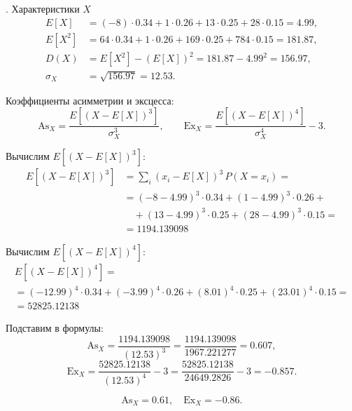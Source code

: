 \documentclass[a4paper,14pt]{extarticle}
\begin{document}
            
            . Характеристики $X$
            \[
                \begin{aligned}
                    E[X] &= (-8)\cdot0.34 + 1\cdot0.26 + 13\cdot0.25 + 28\cdot0.15 = 4.99, \\
                    E[X^2] &= 64\cdot0.34 + 1\cdot0.26 + 169\cdot0.25 + 784\cdot0.15 = 181.87, \\
                    D(X) &= E[X^2] - (E[X])^2 = 181.87 - 4.99^2 = 156.97, \\
                    \sigma_X &= \sqrt{156.97} = 12.53.
                \end{aligned}
            \]
            
            Коэффициенты асимметрии и эксцесса:
            \[
                \mathrm{As}_X = \frac{E[(X - E[X])^3]}{\sigma_X^3},
                \qquad
                \mathrm{Ex}_X = \frac{E[(X - E[X])^4]}{\sigma_X^4} - 3.
            \]
            
            Вычислим $E[(X - E[X])^3]$:
            \[
                \begin{aligned}
                    E[(X - E[X])^3] &= \sum_i (x_i - E[X])^3 \, P(X=x_i) = \\
                    &= (-8 - 4.99)^3 \cdot 0.34 + (1 - 4.99)^3 \cdot 0.26 + \\
                    &\quad + (13 - 4.99)^3 \cdot 0.25 + (28 - 4.99)^3 \cdot 0.15 = \\
                    &= 1194.139098
                \end{aligned}
            \]
            
            Вычислим $E[(X - E[X])^4]$:
            \begin{gather*}
                E[(X - E[X])^4] = \\
                = (-12.99)^4 \cdot 0.34 + (-3.99)^4 \cdot 0.26 + (8.01)^4 \cdot 0.25 + (23.01)^4 \cdot 0.15 = \\
                = 52825.12138
            \end{gather*}
            
            Подставим в формулы:
            \[
                \mathrm{As}_X = \frac{1194.139098}{(12.53)^3} = \frac{1194.139098}{1967.221277} = 0.607,
            \]
            \[
                \mathrm{Ex}_X = \frac{52825.12138}{(12.53)^4} - 3 = \frac{52825.12138}{24649.2826} - 3 = -0.857.
            \]
            
            \[
                \boxed{\mathrm{As}_X = 0.61, \quad \mathrm{Ex}_X = -0.86.}
            \]
            
\end{document}
